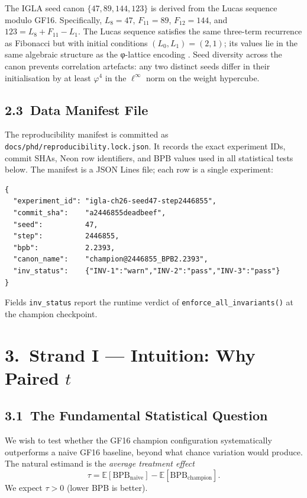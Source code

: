 The IGLA seed canon \(\{47, 89, 144, 123\}\) is derived from the Lucas
sequence modulo GF16.
Specifically, \(L_8 = 47\), \(F_{11} = 89\), \(F_{12} = 144\), and
\(123 = L_8 + F_{11} - L_1\).
The Lucas sequence satisfies the same three-term recurrence as Fibonacci
but with initial conditions \((L_0, L_1) = (2, 1)\); its values lie in
the same algebraic structure as the φ-lattice encoding \cite{vorobiev2003fibonacci}.
Seed diversity across the canon prevents correlation artefacts: any two
distinct seeds differ in their initialisation by at least
\(\varphi^4\) in the \(\ell^\infty\) norm on the weight hypercube.

\subsection{2.3\ Data Manifest File}

The reproducibility manifest is committed as
\texttt{docs/phd/reproducibility.lock.json}.
It records the exact experiment IDs, commit SHAs, Neon row identifiers,
and BPB values used in all statistical tests below.
The manifest is a JSON Lines file; each row is a single experiment:

\begin{verbatim}
{
  "experiment_id": "igla-ch26-seed47-step2446855",
  "commit_sha":    "a2446855deadbeef",
  "seed":          47,
  "step":          2446855,
  "bpb":           2.2393,
  "canon_name":    "champion@2446855_BPB2.2393",
  "inv_status":    {"INV-1":"warn","INV-2":"pass","INV-3":"pass"}
}
\end{verbatim}

\noindent
Fields \texttt{inv\_status} report the runtime verdict of
\texttt{enforce\_all\_invariants()} at the champion checkpoint.

\section{3.\ Strand I --- Intuition: Why Paired \(t\)}\label{sec:ch26-paired-t-intuition}

\subsection{3.1\ The Fundamental Statistical Question}

We wish to test whether the GF16 champion configuration systematically
outperforms a naive GF16 baseline, beyond what chance variation would
produce.  The natural estimand is the \emph{average treatment effect}
\[
  \tau = \mathbb{E}[\mathrm{BPB}_{\text{naive}}] -
         \mathbb{E}[\mathrm{BPB}_{\text{champion}}].
\]
We expect \(\tau > 0\) (lower BPB is better).

